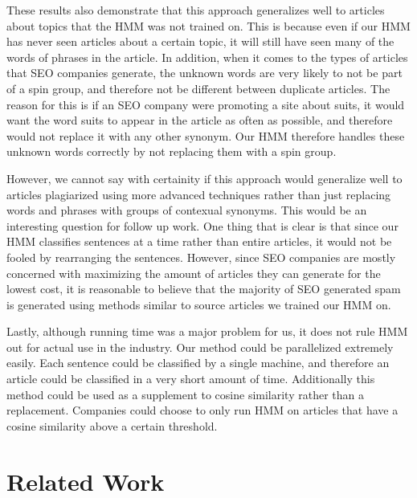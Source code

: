\documentclass[11pt,letterpaper,oneside, titlepage]{scrartcl}
\begin{document}
These results also demonstrate that this approach generalizes well to articles about topics that the HMM was not trained on. This is because even if our HMM has never seen articles about a certain topic, it will still have seen many of the words of phrases in the article. In addition, when it comes to the types of articles that SEO companies generate, the unknown words are very likely to not be part of a spin group, and therefore not be different between duplicate articles. The reason for this is if an SEO company were promoting a site about suits, it would want the word suits to appear in the article as often as possible, and therefore would not replace it with any other synonym. Our HMM therefore handles these unknown words correctly by not replacing them with a spin group. 

However, we cannot say with certainity if this approach would generalize well to articles plagiarized using more advanced techniques rather than just replacing words and phrases with groups of contexual synonyms. This would be an interesting question for follow up work. One thing that is clear is that since our HMM classifies sentences at a time rather than entire articles, it would not be fooled by rearranging the sentences. However, since SEO companies are mostly concerned with maximizing the amount of articles they can generate for the lowest cost, it is reasonable to believe that the majority of SEO generated spam is generated using methods similar to source articles we trained our HMM on.

Lastly, although running time was a major problem for us, it does not rule HMM out for actual use in the industry. Our method could be parallelized extremely easily. Each sentence could be classified by a single machine, and therefore an article could be classified in a very short amount of time. Additionally this method could be used as a supplement to cosine similarity rather than a replacement. Companies could choose to only run HMM on articles that have a cosine similarity above a certain threshold.
\section{Related Work}

\end{document}
